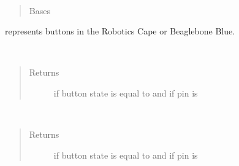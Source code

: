 \documentclass[letterpaper,10pt,english]{sphinxmanual}
\begin{document}
\begin{fulllineitems}
\label{\detokenize{index:rcpy.button.Button}}~\begin{quote}\begin{description}
\item[{Bases}] \leavevmode
{\hyperref[\detokenize{index:rcpy.gpio.Input}]{}}

\end{description}\end{quote}

{\hyperref[\detokenize{index:rcpy.button.Button}]{}} represents buttons in the Robotics Cape or Beaglebone Blue.

\begin{fulllineitems}
\label{\detokenize{index:rcpy.button.Button.is_pressed}}~\begin{quote}\begin{description}
\item[{Returns}] \leavevmode
{} if button state is equal to  and  if pin is 

\end{description}\end{quote}

\end{fulllineitems}


\begin{fulllineitems}
\label{\detokenize{index:rcpy.button.Button.is_released}}~\begin{quote}\begin{description}
\item[{Returns}] \leavevmode
{} if button state is equal to  and  if pin is 

\end{description}\end{quote}


\end{fulllineitems}
\end{fulllineitems}
\end{document}
